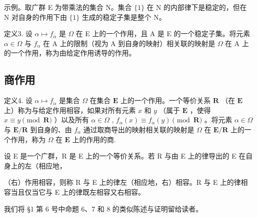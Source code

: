 示例。取广群 E 为带乘法的集合 N。集合 \(\{1\}\) 在 N 的内部律下是稳定的，但在 N 对自身的作用下由 \(\{1\}\) 生成的稳定子集是整个 N。

定义3. 设 \(\alpha \mapsto f_{\alpha}\) 是 \(\Omega\) 在 E 上的一个作用，且 A 是 E 的一个稳定子集。将元素 \(\alpha \in \Omega\) 与 \(f_{\alpha}\) 在 A 上的限制（视为 A 到自身的映射）相关联的映射是 \(\Omega\) 在 A 上的一个作用，称为由给定作用诱导的作用。

\subsection{商作用}

定义4. 设 \(\alpha \mapsto f_{\alpha}\) 是集合 \(\Omega\) 在集合 \(\mathbf{E}\) 上的一个作用。一个等价关系 \(\mathbf{R}\) （在 \(\mathbf{E}\) 上）称为与给定作用相容，如果对所有元素 \(x\) 和 \(y\) （属于 \(\mathbf{E}\) ，使得 \(x \equiv y \pmod{\mathbf{R}}\) ）以及所有 \(\alpha \in \Omega\) , \(f_{\alpha}(x) \equiv f_{\alpha}(y) \pmod{\mathbf{R}}\) 。将元素 \(\alpha \in \Omega\) 与 \(\mathbf{E} / \mathbf{R}\) 到自身的、由 \(f_{\alpha}\) 通过取商导出的映射相关联的映射是 \(\Omega\) 在 \(\mathbf{E} / \mathbf{R}\) 上的一个作用，称为 \(\Omega\) 在 \(\mathbf{E}\) 上的作用的商.

设 E 是一个广群，R 是 E 上的一个等价关系。若 R 与由 E 上的律导出的 E 在自身上的左（相应地，

（右）作用相容，则称 R 与 E 上的律左（相应地，右）相容。R 与 E 上的律相容当且仅当它与 E 上的律既左相容又右相容。

我们将 §1 第 6 号中命题 6、7 和 8 的类似陈述与证明留给读者。
